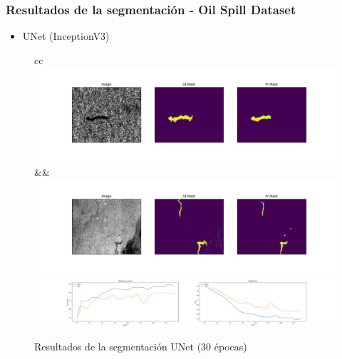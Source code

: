 \begin{frame}
\frametitle{Resultados de la segmentación - Oil Spill Dataset}
\begin{itemize}
    \item UNet (InceptionV3)
\end{itemize}    
\begin{figure}
    \centering
    \begin{tabular}{cc}
         \includegraphics[scale=0.15]{img/section_06/unet_inceptionv3_resultado_01.png}&&
         \includegraphics[scale=0.15]{img/section_06/unet_inceptionv3_resultado_02.png}\\
         \includegraphics[scale=0.12]{img/section_06/unet_inceptionv3_training_results.png}
    \end{tabular}
    \caption{Resultados de la segmentación UNet (30 épocas)}
    \label{fig:my_label}
\end{figure}
\end{frame}

